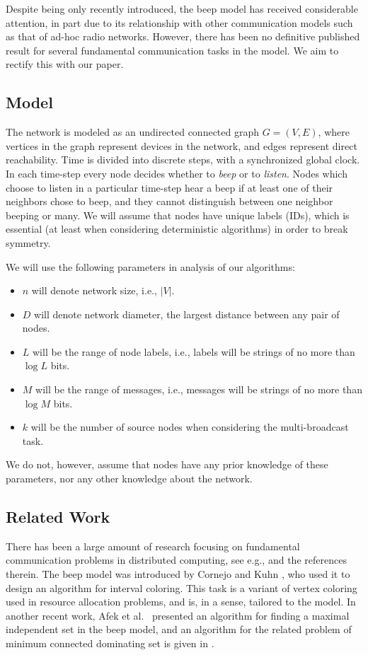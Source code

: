 \documentclass{article}
\begin{document}
Despite being only recently introduced, the beep model has received considerable attention, in part due to its relationship with other communication models such as that of ad-hoc radio networks. However, there has been no definitive published result for several fundamental communication tasks in the model. We aim to rectify this with our paper.

\subsection{Model}

The network is modeled as an undirected connected graph $G=(V,E)$, where vertices in the graph represent devices in the network, and edges represent direct reachability. Time is divided into discrete steps, with a synchronized global clock. In each time-step every node decides whether to \emph{beep} or to \emph{listen}. Nodes which choose to listen in a particular time-step hear a beep if at least one of their neighbors chose to beep, and they cannot distinguish between one neighbor beeping or many. We will assume that nodes have unique labels (IDs), which is essential (at least when considering deterministic algorithms) in order to break symmetry.

We will use the following parameters in analysis of our algorithms:
\begin{itemize}
\item $n$ will denote network size, i.e., $|V|$.
\item $D$ will denote network diameter, the largest distance between any pair of nodes.
\item $L$ will be the range of node labels, i.e., labels will be strings of no more than $\log L$ bits.
\item $M$ will be the range of messages, i.e., messages will be strings of no more than $\log M$ bits.
\item $k$ will be the number of source nodes when considering the multi-broadcast task.
\end{itemize}

We do not, however, assume that nodes have any prior knowledge of these parameters, nor any other knowledge about the network.

\subsection{Related Work}

There has been a large amount of research focusing on fundamental communication problems in distributed computing, see e.g., \cite{-Pel07} and the references therein. The beep model was introduced by Cornejo and Kuhn \cite{-CK10}, who used it to design an algorithm for interval coloring. This task is a variant of vertex coloring used in resource allocation problems, and is, in a sense, tailored to the model. In another recent work, Afek et al.\ \cite{-AABCHK11} presented an algorithm for finding a maximal independent set in the beep model, and an algorithm for the related problem of minimum connected dominating set is given in \cite{-YJYLC15}.
\end{document}
